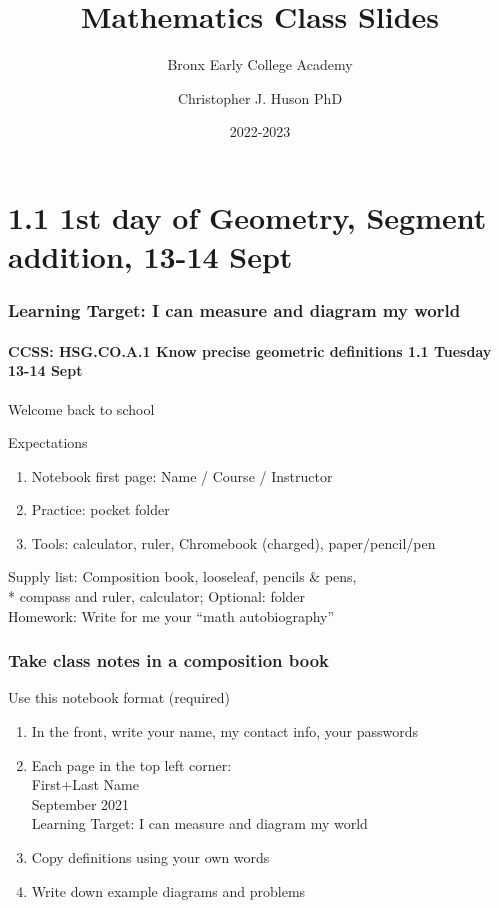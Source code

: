 \documentclass{beamer}
\title{Mathematics Class Slides}
\subtitle{Bronx Early College Academy}
\author{Christopher J. Huson PhD}
\date{2022-2023}
\begin{document}
\frame{\titlepage}
\section[Outline]{}
\frame{\tableofcontents}

\section{1.1 1st day of Geometry, Segment addition, 13-14 Sept}
\frame
{
  \frametitle{Learning Target: I can measure and diagram my world}
  \framesubtitle{CCSS: HSG.CO.A.1 Know precise geometric definitions \hfill \alert{1.1 Tuesday 13-14 Sept}}

  Welcome back to school
  \begin{block}{Expectations}
  \begin{enumerate}
      \item Notebook first page: Name / Course / Instructor
      \item Practice: pocket folder
      \item Tools: calculator, ruler, Chromebook (charged), paper/pencil/pen
  \end{enumerate}
  \end{block}
  Supply list: Composition book, looseleaf, pencils \& pens, \\*
  compass and ruler, calculator; Optional: folder \\[0.25cm]
  Homework: Write for me your ``math autobiography''
}

\frame
{
  \frametitle{Take class notes in a composition book}
  \begin{block}{Use this notebook format (required)}
    \begin{enumerate}
      \item In the front, write your name, my contact info, your passwords
      \item Each page in the top left corner: \\ \qquad First+Last Name \\
       September 2021 \\ \qquad Learning Target: I can measure and diagram my world \vspace{0.25cm}
      \item Copy definitions using your own words
      \item Write down example diagrams and problems
    \end{enumerate}
    \end{block}
}
\end{document}
